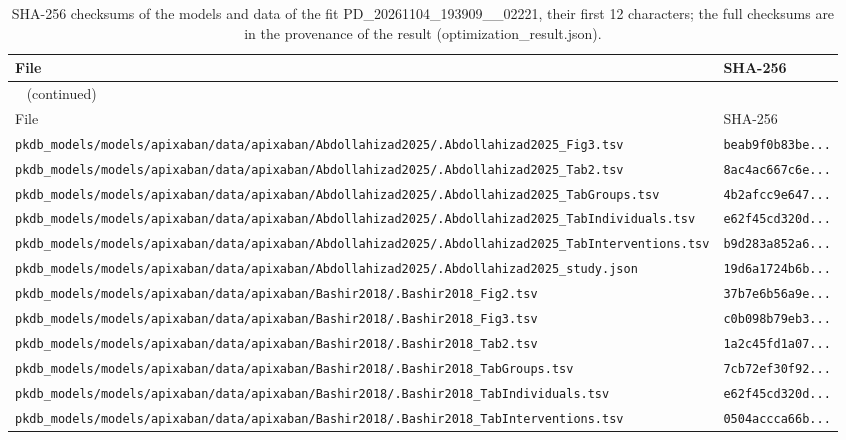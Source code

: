 \documentclass{article}
\begin{document}
\begin{longtable}{ll}
\caption{SHA-256 checksums of the models and data of the fit PD\_20261104\_193909\_\_02221, their first 12 characters; the full checksums are in the provenance of the result (optimization\_result.json).}\label{tab:checksums:PD_20261104_193909__02221} \\
\toprule
File & SHA-256 \\
\midrule
\endfirsthead
\multicolumn{2}{l}{\small\tablename~\thetable{} (continued)} \\
\toprule
File & SHA-256 \\
\midrule
\endhead
\bottomrule
\endlastfoot
\texttt{pkdb\_models/models/apixaban/data/apixaban/Abdollahizad2025/.Abdollahizad2025\_Fig3.tsv} & \texttt{beab9f0b83be...} \\
\texttt{pkdb\_models/models/apixaban/data/apixaban/Abdollahizad2025/.Abdollahizad2025\_Tab2.tsv} & \texttt{8ac4ac667c6e...} \\
\texttt{pkdb\_models/models/apixaban/data/apixaban/Abdollahizad2025/.Abdollahizad2025\_TabGroups.tsv} & \texttt{4b2afcc9e647...} \\
\texttt{pkdb\_models/models/apixaban/data/apixaban/Abdollahizad2025/.Abdollahizad2025\_TabIndividuals.tsv} & \texttt{e62f45cd320d...} \\
\texttt{pkdb\_models/models/apixaban/data/apixaban/Abdollahizad2025/.Abdollahizad2025\_TabInterventions.tsv} & \texttt{b9d283a852a6...} \\
\texttt{pkdb\_models/models/apixaban/data/apixaban/Abdollahizad2025/.Abdollahizad2025\_study.json} & \texttt{19d6a1724b6b...} \\
\texttt{pkdb\_models/models/apixaban/data/apixaban/Bashir2018/.Bashir2018\_Fig2.tsv} & \texttt{37b7e6b56a9e...} \\
\texttt{pkdb\_models/models/apixaban/data/apixaban/Bashir2018/.Bashir2018\_Fig3.tsv} & \texttt{c0b098b79eb3...} \\
\texttt{pkdb\_models/models/apixaban/data/apixaban/Bashir2018/.Bashir2018\_Tab2.tsv} & \texttt{1a2c45fd1a07...} \\
\texttt{pkdb\_models/models/apixaban/data/apixaban/Bashir2018/.Bashir2018\_TabGroups.tsv} & \texttt{7cb72ef30f92...} \\
\texttt{pkdb\_models/models/apixaban/data/apixaban/Bashir2018/.Bashir2018\_TabIndividuals.tsv} & \texttt{e62f45cd320d...} \\
\texttt{pkdb\_models/models/apixaban/data/apixaban/Bashir2018/.Bashir2018\_TabInterventions.tsv} & \texttt{0504accca66b...} \\

\end{longtable}
\end{document}
